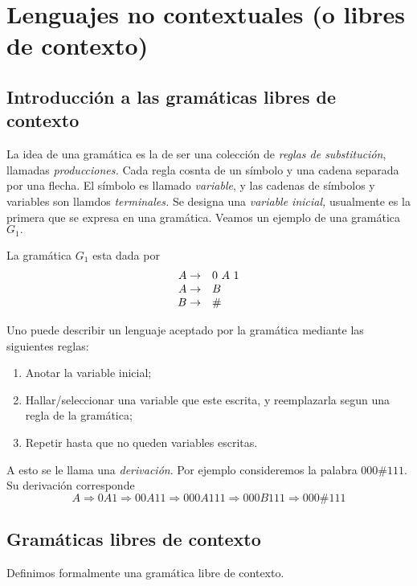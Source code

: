 \chapter[Lenguajes no contextuales]{Lenguajes no contextuales (o libres de contexto)}

\section[Introducci\'on a las gram\'aticas]{Introducci\'on a las gram\'aticas libres de contexto}

La idea de una gram\'atica es la de ser una colecci\'on de \emph{reglas de substituci\'on}, llamadas \emph{producciones.}
Cada regla cosnta de un s\'imbolo y una cadena separada por una flecha.
El s\'imbolo es llamado \emph{variable}, y las cadenas de s\'imbolos y variables son llamdos \emph{terminales.}
Se designa una \emph{variable inicial,} usualmente es la primera que se expresa en una gram\'atica.
Veamos un ejemplo de una gram\'atica \(G_1.\)

\begin{ejemplo}
    La gram\'atica \(G_1\) esta dada por 
    \[\begin{array}{r l}
        A \to & 0\ A\ 1 \\
        A \to & B \\
        B \to & \#
    \end{array}\]
\end{ejemplo}

Uno puede describir un lenguaje aceptado por la gram\'atica mediante las siguientes reglas:
\begin{enumerate}
    \item Anotar la variable inicial;
    \item Hallar/seleccionar una variable que este escrita, y reemplazarla segun una regla de la gram\'atica;
    \item Repetir hasta que no queden variables escritas. 
\end{enumerate}
A esto se le llama una \emph{derivaci\'on}.
Por ejemplo consideremos la palabra \(000\# 111.\)
Su derivaci\'on corresponde \[A \Rightarrow 0A1 \Rightarrow 00A11 \Rightarrow 000A111 \Rightarrow 000B111 \Rightarrow 000\# 111\]

\section{Gram\'aticas libres de contexto}

Definimos formalmente  una gram\'atica libre de contexto.

